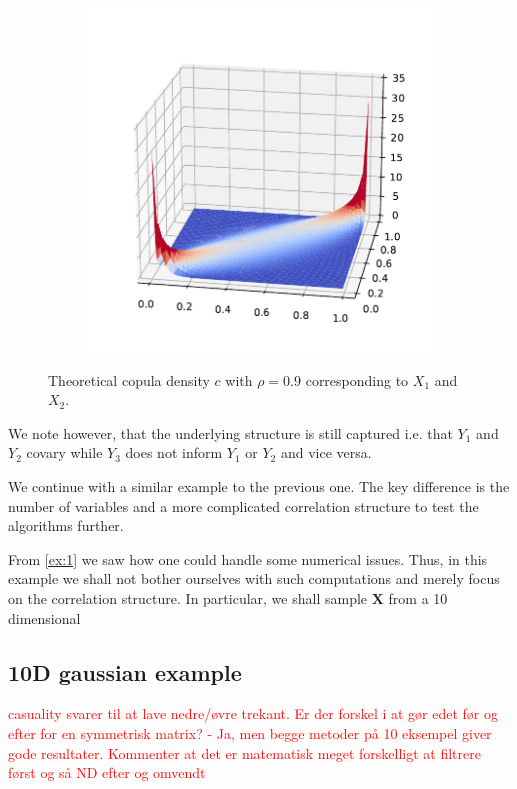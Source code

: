 \documentclass[../Thesis.tex]{subfiles}
\begin{document}
\begin{figure}[H]
\begin{subfigure}[t]{0.5\linewidth}
        \includegraphics[width = \linewidth]{figures/ND examples/Gaussian copula theoretical pdf.pdf}
        \caption{}
    \end{subfigure}
    \caption{Theoretical copula density $c$ with $\rho = 0.9$ corresponding to $X_1$ and $X_2$.}
    \label{fig:gaussian copula truth}
\end{figure}
We note however, that the underlying structure is still captured i.e. that $Y_1$ and $Y_2$ covary while $Y_3$ does not inform $Y_1$ or $Y_2$ and vice versa.


We continue with a similar example to the previous one. The key difference is the number of variables and a more complicated correlation structure to test the algorithms further.
\begin{example}
    From \autoref{ex:1} we saw how one could handle some numerical issues. Thus, in this example we shall not bother ourselves with such computations and merely focus on the correlation structure. In particular, we shall sample $\boldsymbol X$ from a 10 dimensional
\end{example}


\newpage


\subsection{10D gaussian example}
\textcolor{red}{casuality svarer til at lave nedre/øvre trekant. Er der forskel i at gør edet før og efter for en symmetrisk matrix? - Ja, men begge metoder på 10 eksempel giver gode resultater. Kommenter at det er matematisk meget forskelligt at filtrere først og så ND efter og omvendt}
\end{document}
